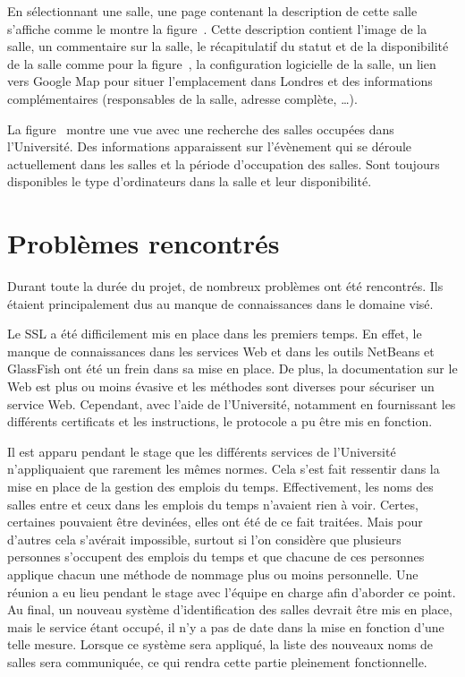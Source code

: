 En s\'electionnant une salle, une page contenant la description de cette salle s'affiche comme le montre la figure~.
Cette description contient l'image de la salle, un commentaire sur la salle, le r\'ecapitulatif du statut et de la disponibilit\'e de la salle comme pour la figure~, la configuration logicielle de la salle, un lien vers Google Map pour situer l'emplacement dans Londres et des informations compl\'ementaires (responsables de la salle, adresse compl\`ete, \ldots).

La figure~ montre une vue avec une recherche des salles occup\'ees dans l'Universit\'e.
Des informations apparaissent sur l'\'ev\`enement qui se d\'eroule actuellement dans les salles et la p\'eriode d'occupation des salles.
Sont toujours disponibles le type d'ordinateurs dans la salle et leur disponibilit\'e.



\section{Probl\`emes rencontr\'es}

Durant toute la dur\'ee du projet, de nombreux probl\`emes ont \'et\'e rencontr\'es.
Ils \'etaient principalement dus au manque de connaissances dans le domaine vis\'e.

Le SSL a \'et\'e difficilement mis en place dans les premiers temps.
En effet, le manque de connaissances dans les services Web et dans les outils NetBeans et GlassFish ont \'et\'e un frein dans sa mise en place.
De plus, la documentation sur le Web est plus ou moins \'evasive et les m\'ethodes sont diverses pour s\'ecuriser un service Web.
Cependant, avec l'aide de l'Universit\'e, notamment en fournissant les diff\'erents certificats et les instructions, le protocole a pu \^etre mis en fonction.

Il est apparu pendant le stage que les diff\'erents services de l'Universit\'e n'appliquaient que rarement les m\^emes normes.
Cela s'est fait ressentir dans la mise en place de la gestion des emplois du temps.
Effectivement, les noms des salles entre {\YuukouII} et ceux dans les emplois du temps n'avaient rien \`a voir.
Certes, certaines pouvaient \^etre devin\'ees, elles ont \'et\'e de ce fait trait\'ees.
Mais pour d'autres cela s'av\'erait impossible, surtout si l'on consid\`ere que plusieurs personnes s'occupent des emplois du temps et que chacune de ces personnes applique chacun une m\'ethode de nommage plus ou moins personnelle.
Une r\'eunion a eu lieu pendant le stage avec l'\'equipe en charge afin d'aborder ce point.
Au final, un nouveau syst\`eme d'identification des salles devrait \^etre mis en place, mais le service \'etant occup\'e, il n'y a pas de date dans la mise en fonction d'une telle mesure.
Lorsque ce syst\`eme sera appliqu\'e, la liste des nouveaux noms de salles sera communiqu\'ee, ce qui rendra cette partie pleinement fonctionnelle.




\clearpage
